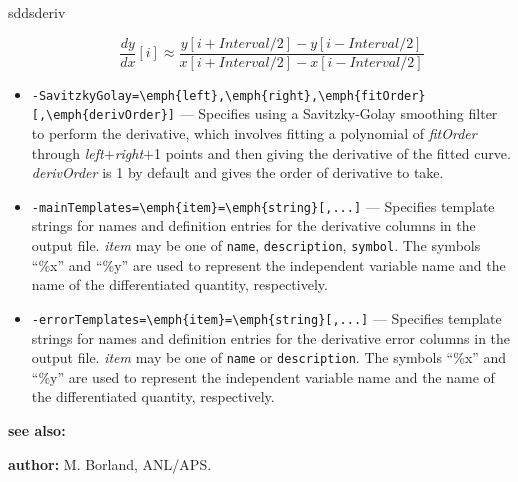\begin{sddsprog}{sddsderiv}
\begin{itemize}
        \[
        \frac{d y}{d x}[i] \approx \frac{y[i+\textit{Interval}/2] - y[i-\textit{Interval}/2]}{x[i+\textit{Interval}/2] - x[i-\textit{Interval}/2]}
        \]
      \item \verb|-SavitzkyGolay=\emph{left},\emph{right},\emph{fitOrder}[,\emph{derivOrder}]| --- Specifies using a Savitzky-Golay smoothing filter to perform the derivative, which involves fitting a polynomial of \emph{fitOrder} through \emph{left}+\emph{right}+1 points and then giving the derivative of the fitted curve. \emph{derivOrder} is 1 by default and gives the order of derivative to take.
      \item \verb|-mainTemplates=\emph{item}=\emph{string}[,...]| --- Specifies template strings for names and definition entries for the derivative columns in the output file. \emph{item} may be one of \verb|name|, \verb|description|, \verb|symbol|. The symbols ``\%x'' and ``\%y'' are used to represent the independent variable name and the name of the differentiated quantity, respectively.
      \item \verb|-errorTemplates=\emph{item}=\emph{string}[,...]| --- Specifies template strings for names and definition entries for the derivative error columns in the output file. \emph{item} may be one of \verb|name| or \verb|description|. The symbols ``\%x'' and ``\%y'' are used to represent the independent variable name and the name of the differentiated quantity, respectively.
    \end{itemize}
  \item {\bf see also:} 
  \item {\bf author:} M. Borland, ANL/APS.
\end{sddsprog}
